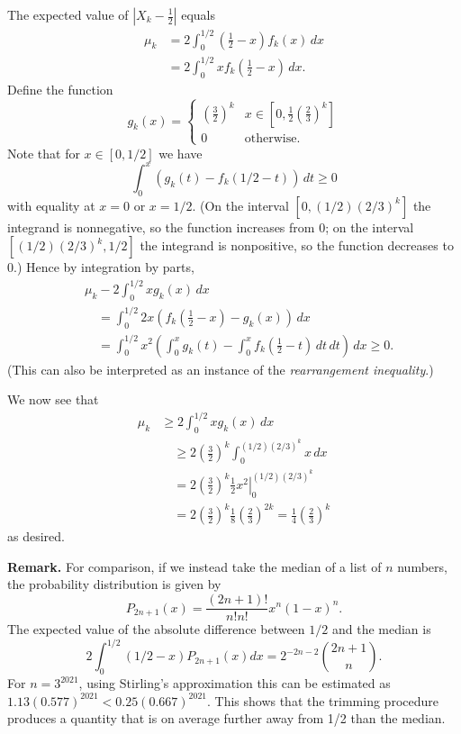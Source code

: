 \documentclass[amssymb,twocolumn,pra,10pt,aps]{revtex4-1}
\begin{document}
\begin{itemize}
The expected value of $|X_k-\frac{1}{2}|$ equals
\begin{align*}
\mu_k &= 2 \int_0^{1/2} \left( \frac{1}{2} - x \right) f_k(x)\,dx \\
&= 2 \int_0^{1/2} x f_k\left( \frac{1}{2} - x \right)\,dx.%
\end{align*}
Define the function
\[
g_k(x) = \begin{cases} \left( \frac{3}{2} \right)^k & x \in \left[ 0, \frac{1}{2} \left( \frac{2}{3} \right)^k \right] \\ 0 & \mbox{otherwise}.
\end{cases}
\]
Note that for $x \in [0, 1/2]$ we have
\[
\int_0^x (g_k(t) - f_k(1/2-t))\,dt \geq 0
\]
with equality at $x=0$ or $x=1/2$. (On the interval $[0, (1/2)(2/3)^k]$ the integrand is nonnegative, so the function increases from 0; on the interval $[(1/2)(2/3)^k, 1/2]$ the integrand is nonpositive, so the function decreases to 0.)
Hence by integration by parts,
\begin{align*}
&\mu_k - 2 \int_0^{1/2} x g_k(x) \,dx \\
&\quad = \int_0^{1/2} 2x (f_k\left( \frac{1}{2} - x \right) - g_k(x)) \,dx \\
&\quad = \int_0^{1/2} x^2 \left( \int_0^x g_k(t) - \int_0^x f_k\left( \frac{1}{2} - t \right)\,dt \,dt \right)\,dx \geq 0. 
\end{align*}
(This can also be interpreted as an instance of the \emph{rearrangement inequality}.)

We now see that
\begin{align*}
\mu_k &\geq 2\int_0^{1/2} x g_k(x)\,dx \\
&\quad \geq 2 \left( \frac{3}{2} \right)^k \int_0^{(1/2)(2/3)^k} x\,dx\\
&\quad = 2 \left( \frac{3}{2} \right)^k \left. \frac{1}{2} x^2 \right|_0^{(1/2)(2/3)^k} \\
&\quad = 2 \left( \frac{3}{2} \right)^k \frac{1}{8} \left( \frac{2}{3} \right)^{2k}  = \frac{1}{4} \left( \frac{2}{3} \right)^k
\end{align*}
as desired.



\noindent
\textbf{Remark.}
For comparison, if we instead take the median of a list of $n$ numbers, the probability distribution is given by
\[
P_{2n+1}(x) = \frac{(2n+1)!}{n!n!} x^n (1-x)^n.
\]
The expected value of the absolute difference between $1/2$ and the median is 
\[
2 \int_0^{1/2} (1/2 - x) P_{2n+1}(x) dx = 2^{-2n-2}{{2n+1}\choose n}.
\]
For $n = 3^{2021}$, using Stirling's approximation this can be estimated as
$1.13 (0.577)^{2021} < 0.25 (0.667)^{2021}$. This shows that the trimming procedure produces a quantity that is on average further away from 1/2 than the median.

\end{itemize}
\end{document}
